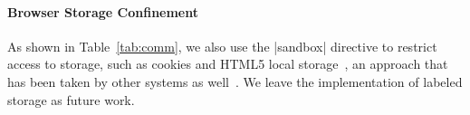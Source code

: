 \paragraph{Browser Storage Confinement}
As shown in Table~\ref{tab:comm}, we also use the \js|sandbox|
directive to restrict access to storage, such as cookies and HTML5
local storage~\cite{html5}, an approach that has been taken by other systems as well~\cite{Akhawe2013}.
%
%
We leave the implementation of labeled storage as
future work.


%
%
%
%
%

